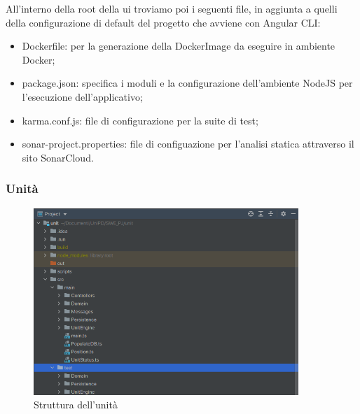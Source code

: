 	All'interno della root della ui troviamo poi i seguenti file, in aggiunta a quelli della configurazione di default del progetto che avviene con Angular CLI:
	\begin{itemize}
		\item{Dockerfile}: per la generazione della DockerImage da eseguire in ambiente Docker;
		\item{package.json}: specifica i moduli e la configurazione dell'ambiente NodeJS per l'esecuzione dell'applicativo;
		\item{karma.conf.js}: file di configurazione per la suite di test;
		\item{sonar-project.properties}: file di configuazione per l'analisi statica attraverso il sito	SonarCloud.
	\end{itemize}

\newpage

	\subsubsection{Unità}
	
	\begin{figure}[H]
		\centering
		\includegraphics[width=10cm]{img/struttura_unita.png}
		\caption{Struttura dell'unità}
	\end{figure}

